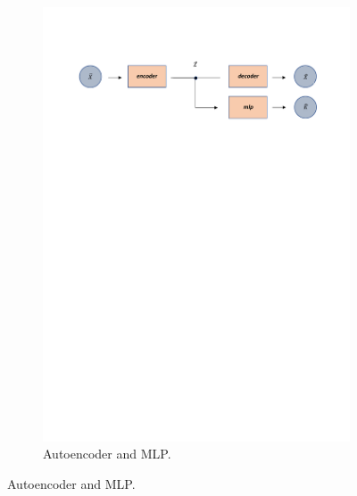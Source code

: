 \begin{figure}[H]
\begin{subfigure}{1\linewidth}  
 \centering
  \includegraphics[width=\linewidth]{Figuras_tfg/Diagram_auto_mlp}
  \caption{Autoencoder and MLP.}
  \label{fig:FigA_Autoencoder_MLP} 
\end{subfigure}


\end{figure}
